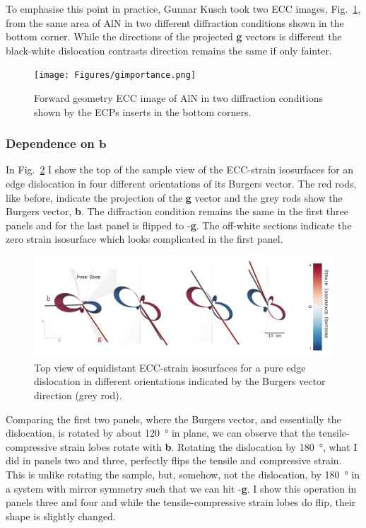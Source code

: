 To emphasise this point in practice, Gunnar Kusch took two ECC images, Fig.~\ref{fig:gimportance},  from the same area of AlN in two different diffraction conditions shown in the bottom corner.   While the directions of the projected \textbf{g} vectors is different the black-white dislocation contrasts direction remains the same if only fainter. 

\begin{figure}[ht]
    \centering
    \texttt{[image: Figures/gimportance.png]}
    \caption[AlN ECCI in two diffraction conditions.]{Forward geometry ECC image of AlN in two diffraction conditions shown by the ECPs inserts in the bottom corners.}
    \label{fig:gimportance}
\end{figure}
\subsubsection{Dependence on \texorpdfstring{$\mathbf{b}$}{b}}

In Fig.~\ref{fig:bdependence} I show the top of the sample view of the ECC-strain isosurfaces for an edge dislocation in four different orientations of its Burgers vector.  The red rods, like before, indicate the projection of the \textbf{g} vector and the grey rods show the Burgers vector, \textbf{b}. The diffraction condition remains the same in the first three panels and for the last panel is flipped to -\textbf{g}. The off-white sections indicate the zero strain isosurface which looks complicated in the first panel.


\begin{figure}[ht]
    \centering
    \includegraphics[width=1\linewidth]{Figures/bdependence.png}
    \caption[Edge TD top view of equidistant ECC-strain isosurfaces.]{Top view of equidistant ECC-strain isosurfaces for a pure edge dislocation in different orientations indicated by the Burgers vector direction (grey rod).}
    \label{fig:bdependence}
\end{figure}

Comparing the first two panels, where the Burgers vector, and essentially the dislocation, is rotated by about \SI{120}{\degree} in plane, we can observe that the tensile-compressive strain lobes rotate with \textbf{b}. Rotating the dislocation by \SI{180}{\degree}, what I did in panels two and three, perfectly flips the tensile and compressive strain. This is unlike rotating the sample, but, somehow, not the dislocation, by \SI{180}{\degree} in a system with mirror symmetry such that we can hit -\textbf{g}. I show this operation in panels three and four and while the  tensile-compressive strain lobes do flip, their shape is slightly changed. 

